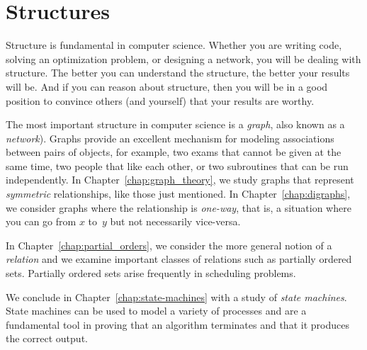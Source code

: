 \part{Structures}
\label{part:structures}

\partintro

Structure is fundamental in computer science.  Whether you are writing
code, solving an optimization problem, or designing a network, you
will be dealing with structure.  The better you can understand the
structure, the better your results will be.  And if you can reason
about structure, then you will be in a good position to convince
others (and yourself) that your results are worthy.

The most important structure in computer science is a \emph{graph},
also known as a \emph{network}).  Graphs provide an excellent
mechanism for modeling associations between pairs of objects, for
example, two exams that cannot be given at the same time, two people
that like each other, or two subroutines that can be run
independently.  In Chapter~\ref{chap:graph_theory}, we study graphs
that represent \emph{symmetric} relationships, like those just
mentioned.  In Chapter~\ref{chap:digraphs}, we consider graphs where
the relationship is \emph{one-way}, that is, a situation where you can
go from $x$ to~$y$ but not necessarily vice-versa.

In Chapter~\ref{chap:partial_orders}, we consider the more general
notion of a \emph{relation} and we examine important classes of
relations such as partially ordered sets.  Partially ordered sets
arise frequently in scheduling problems.

We conclude in Chapter~\ref{chap:state-machines} with a study of
\emph{state machines}.  State machines can be used to model a variety
of processes and are a fundamental tool in proving that an algorithm
terminates and that it produces the correct output.

\endinput
